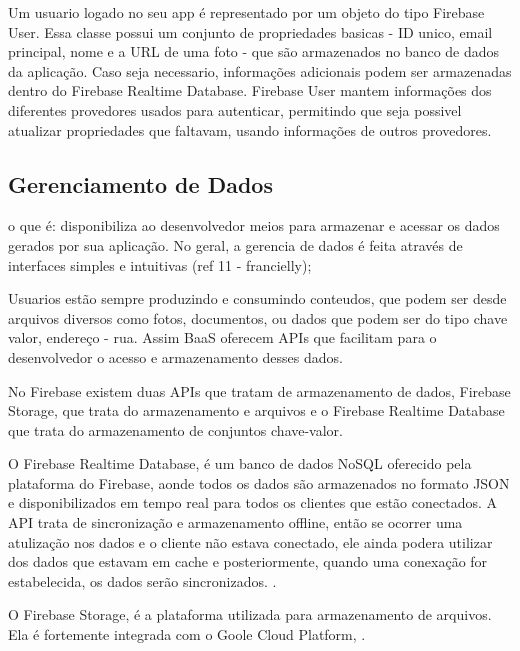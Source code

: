 	Um usuario logado no seu app é representado por um objeto do tipo Firebase User. Essa  classe possui um conjunto de propriedades basicas - ID unico, email principal, nome e a URL de uma foto - que são armazenados no banco de dados da aplicação. Caso seja necessario, informações adicionais podem ser armazenadas dentro do Firebase Realtime Database. Firebase User mantem informações dos diferentes provedores usados para autenticar, permitindo que seja possivel atualizar propriedades que faltavam, usando informações de outros provedores.


	\subsection{Gerenciamento de Dados}
	\label{subsec:data_management}
	o que é: disponibiliza ao desenvolvedor meios para armazenar e acessar os dados gerados por sua aplicação. No geral, a gerencia de dados é feita através de interfaces simples e intuitivas (ref 11 - francielly);
	
	Usuarios estão sempre produzindo e consumindo conteudos, que podem ser desde arquivos diversos como fotos, documentos, ou dados que podem ser do tipo chave valor, endereço - rua. Assim BaaS oferecem APIs que facilitam para o desenvolvedor o acesso e armazenamento desses dados. 


	No Firebase existem duas APIs que tratam de armazenamento de dados, Firebase Storage, que trata do armazenamento e arquivos e o Firebase Realtime Database que trata do armazenamento de conjuntos chave-valor.
	
	O Firebase Realtime Database, é um banco de dados NoSQL oferecido pela plataforma do Firebase, aonde todos os dados são armazenados no formato JSON e disponibilizados em tempo real para todos os clientes que estão conectados. A API trata de sincronização e armazenamento offline, então se ocorrer uma atulização nos dados e o cliente não estava conectado, ele ainda podera utilizar dos dados que estavam em cache e posteriormente, quando uma conexação for estabelecida, os dados serão sincronizados.
	\cite{https://firebase.google.com/docs/database/}.


	O Firebase Storage, é a plataforma utilizada para armazenamento de arquivos. Ela é fortemente integrada com o Goole Cloud Platform, 
	\cite{https://firebase.google.com/docs/storage/}.

